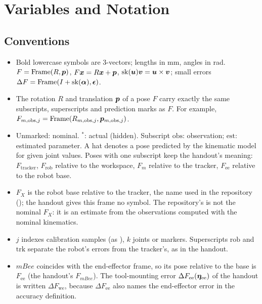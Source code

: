 \documentclass[../main.tex]{subfiles}
\begin{document}
\section{Variables and Notation}\label{sec:variables}
\newcommand{\tgroup}[2]{\multicolumn{#1}{@{}l}{\rule{0pt}{2.6ex}\textbf{#2}}\\\midrule}

\subsection{Conventions}
\begin{itemize}
\item Bold lowercase symbols are 3-vectors; lengths in mm, angles in rad. $F=\operatorname{Frame}(R,\bm{p})$, $F\bm{x}=R\bm{x}+\bm{p}$, $\operatorname{sk}(\bm{u})\bm{v}=\bm{u}\times\bm{v}$; small errors $\Delta F=\operatorname{Frame}(I+\operatorname{sk}(\bm{\alpha}),\bm{\epsilon})$.
\item The rotation $R$ and translation $\bm{p}$ of a pose $F$ carry exactly the same subscripts, superscripts and prediction marks as $F$. For example, $F_{m,\mathrm{obs},j}=\operatorname{Frame}(R_{m,\mathrm{obs},j},\bm{p}_{m,\mathrm{obs},j})$.
\item Unmarked: nominal. $^*$: actual (hidden). Subscript $\mathrm{obs}$: observation; $\mathrm{est}$: estimated parameter. A hat denotes a pose predicted by the kinematic model for given joint values. Poses with one subscript keep the handout's meaning: $F_{\mathrm{tracker}}$, $F_{\mathrm{rob}}$ relative to the workspace, $F_m$ relative to the tracker, $F_{\mathrm{ee}}$ relative to the robot base.
\item $F_X$ is the robot base relative to the tracker, the name used in the repository (); the handout gives this frame no symbol. The repository's  is not the nominal $F_X$: it is an estimate from the observations computed with the nominal kinematics.
\item $j$ indexes calibration samples (as ), $k$ joints or markers. Superscripts $\mathrm{rob}$ and $\mathrm{trk}$ separate the robot's errors from the tracker's, as in the handout.
\item $mBee$ coincides with the end-effector frame, so its pose relative to the base is $F_{\mathrm{ee}}$ (the handout's $F_{mBee}$). The tool-mounting error $\Delta F_{\mathrm{ee}}(\bm{\eta}_{\mathrm{ee}})$ of the handout is written $\Delta F_{\mathrm{we}}$, because $\Delta F_{\mathrm{ee}}$ also names the end-effector error in the accuracy definition.
\end{itemize}
\end{document}
